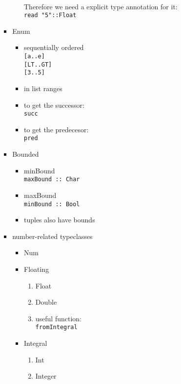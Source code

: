 \documentclass[a4paper,10pt]{article}
\begin{document}
\begin{enumerate}
\begin{itemize}
\begin{itemize}
\begin{itemize}
\begin{itemize}
      \\Therefore we need a explicit type annotation for it:
      \\\texttt{read "5"::Float} 
     \end{itemize}
     \item Enum
     \begin{itemize}
      \item sequentially ordered
      \\\texttt{[\textquotesingle a\textquotesingle ..\textquotesingle e\textquotesingle ]}
      \\\texttt{[LT..GT]}
      \\\texttt{[3..5]}
      \item in list ranges
      \item to get the successor:
      \\\texttt{succ}
      \item to get the predecesor:
      \\\texttt{pred}
     \end{itemize}
     \item Bounded
     \begin{itemize}
      \item minBound
      \\\texttt{maxBound :: Char}
      \item maxBound
      \\\texttt{minBound :: Bool}
      \item tuples also have bounds
     \end{itemize}
     \item number-related typeclasses
     \begin{itemize}
      \item Num
      \item Floating
      \begin{enumerate}
       \item Float
       \item Double
       \item useful function:
       \\\texttt{fromIntegral}
      \end{enumerate}
      \item Integral
      \begin{enumerate}
       \item Int
       \item Integer
      \end{enumerate}
     \end{itemize}
    \end{itemize}
   \end{itemize}
  \end{itemize}
\end{enumerate}
\end{document}
